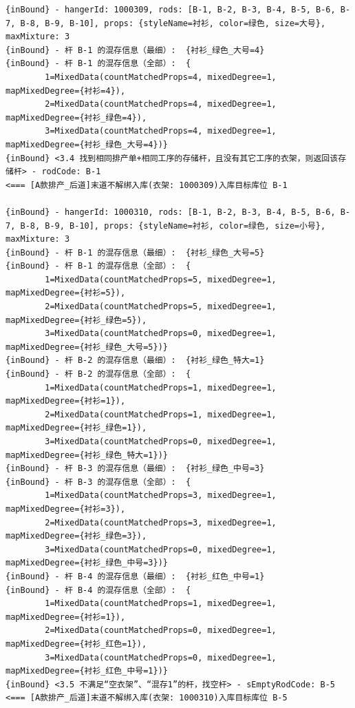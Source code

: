 {\begin{verbatim}
{inBound} - hangerId: 1000309, rods: [B-1, B-2, B-3, B-4, B-5, B-6, B-7, B-8, B-9, B-10], props: {styleName=衬衫, color=绿色, size=大号}, maxMixture: 3
{inBound} - 杆 B-1 的混存信息（最细）:  {衬衫_绿色_大号=4}
{inBound} - 杆 B-1 的混存信息（全部）:  {
		1=MixedData(countMatchedProps=4, mixedDegree=1, mapMixedDegree={衬衫=4}), 
		2=MixedData(countMatchedProps=4, mixedDegree=1, mapMixedDegree={衬衫_绿色=4}), 
		3=MixedData(countMatchedProps=4, mixedDegree=1, mapMixedDegree={衬衫_绿色_大号=4})}
{inBound} <3.4 找到相同排产单+相同工序的存储杆，且没有其它工序的衣架，则返回该存储杆> - rodCode: B-1
<=== [A款排产_后道]末道不解绑入库(衣架: 1000309)入库目标库位 B-1

{inBound} - hangerId: 1000310, rods: [B-1, B-2, B-3, B-4, B-5, B-6, B-7, B-8, B-9, B-10], props: {styleName=衬衫, color=绿色, size=小号}, maxMixture: 3
{inBound} - 杆 B-1 的混存信息（最细）:  {衬衫_绿色_大号=5}
{inBound} - 杆 B-1 的混存信息（全部）:  {
		1=MixedData(countMatchedProps=5, mixedDegree=1, mapMixedDegree={衬衫=5}), 
		2=MixedData(countMatchedProps=5, mixedDegree=1, mapMixedDegree={衬衫_绿色=5}), 
		3=MixedData(countMatchedProps=0, mixedDegree=1, mapMixedDegree={衬衫_绿色_大号=5})}
{inBound} - 杆 B-2 的混存信息（最细）:  {衬衫_绿色_特大=1}
{inBound} - 杆 B-2 的混存信息（全部）:  {
		1=MixedData(countMatchedProps=1, mixedDegree=1, mapMixedDegree={衬衫=1}), 
		2=MixedData(countMatchedProps=1, mixedDegree=1, mapMixedDegree={衬衫_绿色=1}), 
		3=MixedData(countMatchedProps=0, mixedDegree=1, mapMixedDegree={衬衫_绿色_特大=1})}
{inBound} - 杆 B-3 的混存信息（最细）:  {衬衫_绿色_中号=3}
{inBound} - 杆 B-3 的混存信息（全部）:  {
		1=MixedData(countMatchedProps=3, mixedDegree=1, mapMixedDegree={衬衫=3}), 
		2=MixedData(countMatchedProps=3, mixedDegree=1, mapMixedDegree={衬衫_绿色=3}), 
		3=MixedData(countMatchedProps=0, mixedDegree=1, mapMixedDegree={衬衫_绿色_中号=3})}
{inBound} - 杆 B-4 的混存信息（最细）:  {衬衫_红色_中号=1}
{inBound} - 杆 B-4 的混存信息（全部）:  {
		1=MixedData(countMatchedProps=1, mixedDegree=1, mapMixedDegree={衬衫=1}), 
		2=MixedData(countMatchedProps=0, mixedDegree=1, mapMixedDegree={衬衫_红色=1}), 
		3=MixedData(countMatchedProps=0, mixedDegree=1, mapMixedDegree={衬衫_红色_中号=1})}
{inBound} <3.5 不满足“空衣架”、“混存1”的杆，找空杆> - sEmptyRodCode: B-5
<=== [A款排产_后道]末道不解绑入库(衣架: 1000310)入库目标库位 B-5


\end{verbatim}}
